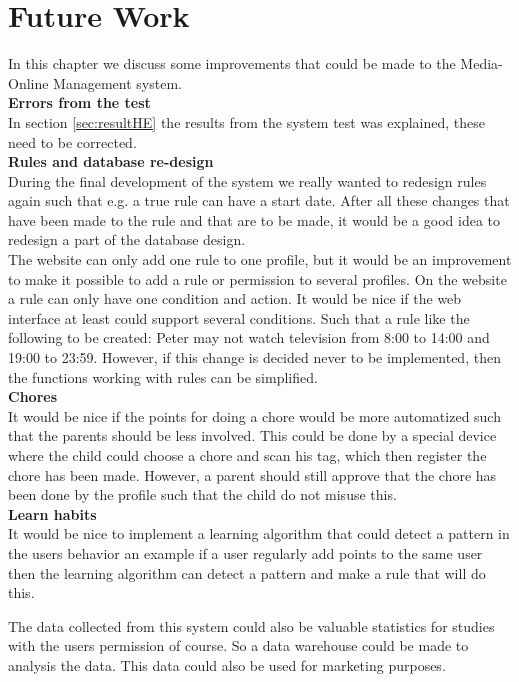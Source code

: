 \chapter{Future Work}
In this chapter we discuss some improvements that could be made to the Media-Online Management system.\\

\textbf{Errors from the test}\\
In section \vref{sec:resultHE} the results from the system test was explained, these need to be corrected.\\
 
\textbf{Rules and database re-design}\\
During the final development of the system we really wanted to redesign rules again such that e.g. a true rule can have a start date. After all these changes that have been made to the rule and that are to be made, it would be a good idea to redesign a part of the database design. \\

The website can only add one rule to one profile, but it would be an improvement to make it possible to add a rule or permission to several profiles. On the website a rule can only have one condition and action. It would be nice if the web interface at least could support several conditions. Such that a rule like the following to be created: Peter may not watch television from 8:00 to 14:00 and 19:00 to 23:59. However, if this change is decided never to be implemented, then the functions working with rules can be simplified. \\

\textbf{Chores}\\
It would be nice if the points for doing a chore would be more automatized such that the parents should be less involved. This could be done by a special device where the child could choose a chore and scan his tag, which then register the chore has been made. However, a parent should still approve that the chore has been done by the profile such that the child do not misuse this.\\

\textbf{Learn habits}\\
It would be nice to implement a learning algorithm that could detect a pattern in the users behavior an example if a user regularly add points to the same user then the learning algorithm can detect a pattern and make a rule that will do this. 

The data collected from this system could also be valuable statistics for studies with the users permission of course. So a data warehouse could be made to analysis the data. This data could also be used for marketing purposes. \\

